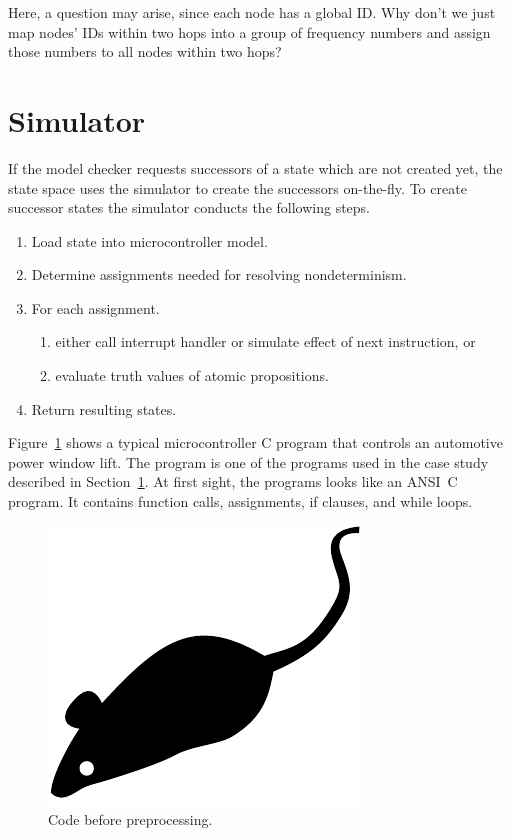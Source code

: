Here, a question may arise, since each node has a global ID. Why
don't we just map nodes' IDs within two hops into a group of
frequency numbers and assign those numbers to all nodes within two
hops?

\section{Simulator}
\label{sec:sim}

If the model checker requests successors of a state which are not
created yet, the state space uses the simulator to create the
successors on-the-fly. To create successor states the simulator
conducts the following steps.
\begin{enumerate}
\item Load state into microcontroller model.
\item Determine assignments needed for resolving nondeterminism.
\item For each assignment.
      \begin{enumerate}
      \item either call interrupt handler or simulate effect of next instruction, or
      \item evaluate truth values of atomic propositions.
      \end{enumerate}
\item Return resulting states.
\end{enumerate}
Figure~\ref{fig:one} shows a typical microcontroller C program that
controls an automotive power window lift. The program is one of the
programs used in the case study described in Section~\ref{sec:sim}.
At first sight, the programs looks like an ANSI~C program. It
contains function calls, assignments, if clauses, and while loops.
\begin{figure}
  \includegraphics{mouse}
  \caption{Code before preprocessing.}
  \label{fig:one}
\end{figure}

